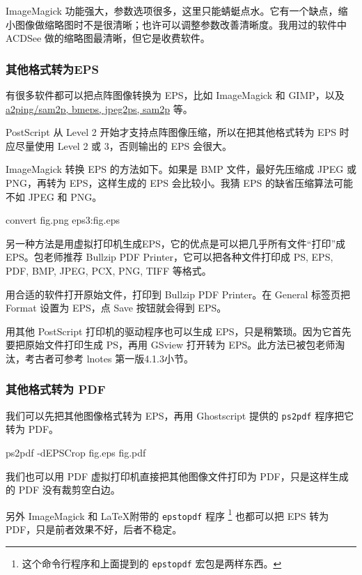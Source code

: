 ImageMagick 功能强大，参数选项很多，这里只能蜻蜓点水。它有一个缺点，缩小图像做缩略图时不是很清晰；也许可以调整参数改善清晰度。我用过的软件中 ACDSee 做的缩略图最清晰，但它是收费软件。

\subsubsection{其他格式转为EPS}

有很多软件都可以把点阵图像转换为 EPS，比如 ImageMagick 和 GIMP，以及 \href{https://texfaq.org/FAQ-dvipsgraphics}{a2ping/sam2p, bmeps, jpeg2ps, sam2p} 等。

PostScript 从 Level 2 开始才支持点阵图像压缩，所以在把其他格式转为 EPS 时应尽量使用 Level 2 或 3，否则输出的 EPS 会很大。

ImageMagick 转换 EPS 的方法如下。如果是 BMP 文件，最好先压缩成 JPEG 或 PNG，再转为 EPS，这样生成的 EPS 会比较小。我猜 EPS 的缺省压缩算法可能不如 JPEG 和 PNG。

\begin{Code}
convert fig.png eps3:fig.eps
\end{Code}

另一种方法是用虚拟打印机生成EPS，它的优点是可以把几乎所有文件“打印”成 EPS。包老师推荐 Bullzip PDF Printer，它可以把各种文件打印成 PS, EPS, PDF, BMP, JPEG, PCX, PNG, TIFF 等格式。

用合适的软件打开原始文件，打印到 Bullzip PDF Printer。在 General 标签页把 Format 设置为 EPS，点 Save 按钮就会得到 EPS。

用其他 PostScript 打印机的驱动程序也可以生成 EPS，只是稍繁琐。因为它首先要把原始文件打印生成 PS，再用 GSview 打开转为 EPS。此方法已被包老师淘汰，考古者可参考 lnotes 第一版\citep{Huang_lnotes}4.1.3小节。

\subsubsection{其他格式转为 PDF}

我们可以先把其他图像格式转为 EPS，再用 Ghostscript 提供的 \texttt{ps2pdf} 程序把它转为 PDF。

\begin{Code}
ps2pdf -dEPSCrop fig.eps fig.pdf
\end{Code}

我们也可以用 PDF 虚拟打印机直接把其他图像文件打印为 PDF，只是这样生成的 PDF 没有裁剪空白边。

另外 ImageMagick 和 \LaTeX 附带的 \texttt{epstopdf} 程序 \footnote{这个命令行程序和上面提到的 \texttt{epstopdf} 宏包是两样东西。} 也都可以把 EPS 转为 PDF，只是前者效果不好，后者不稳定。

